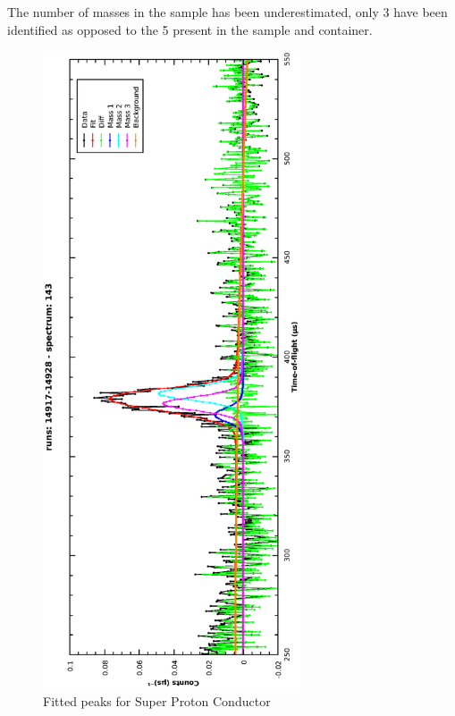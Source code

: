 \documentclass[a4paper]{article}
\begin{document}
The number of masses in the sample has been underestimated, only 3 have been
identified as opposed to the 5 present in the sample and container.

\begin{figure}[h!]
  \centering
  \vspace{-60pt}
  \begin{turn}{-90}
    \includegraphics[width=0.68\textwidth]{graphics/model_sel_super-proton-conductor.eps}
  \end{turn}
  \vspace{-60pt}
  \caption{Fitted peaks for Super Proton Conductor}
  \label{fig:model_sel_super-proton-conductor}
\end{figure}
\FloatBarrier
\end{document}
